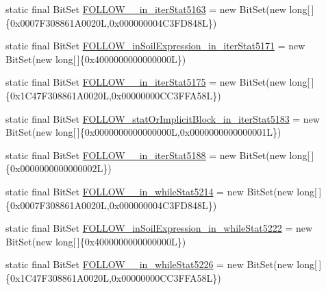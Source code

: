 \begin{DoxyCompactItemize}
\item 
static final Bit\-Set \hyperlink{classorg_1_1tzi_1_1use_1_1parser_1_1shell_1_1_shell_command_parser_af49d5e08066f8ac042ed235657e0912f}{F\-O\-L\-L\-O\-W\-\_\-\_\-in\-\_\-iter\-Stat5163} = new Bit\-Set(new long\mbox{[}$\,$\mbox{]}\{0x0007\-F308861\-A0020\-L,0x000000004\-C3\-F\-D848\-L\})
\item 
static final Bit\-Set \hyperlink{classorg_1_1tzi_1_1use_1_1parser_1_1shell_1_1_shell_command_parser_a2766603c428e92c94c89ec6201239239}{F\-O\-L\-L\-O\-W\-\_\-in\-Soil\-Expression\-\_\-in\-\_\-iter\-Stat5171} = new Bit\-Set(new long\mbox{[}$\,$\mbox{]}\{0x4000000000000000\-L\})
\item 
static final Bit\-Set \hyperlink{classorg_1_1tzi_1_1use_1_1parser_1_1shell_1_1_shell_command_parser_a88328df1abd2318b8b4a519a86657374}{F\-O\-L\-L\-O\-W\-\_\-\_\-in\-\_\-iter\-Stat5175} = new Bit\-Set(new long\mbox{[}$\,$\mbox{]}\{0x1\-C47\-F308861\-A0020\-L,0x00000000\-C\-C3\-F\-F\-A58\-L\})
\item 
static final Bit\-Set \hyperlink{classorg_1_1tzi_1_1use_1_1parser_1_1shell_1_1_shell_command_parser_ad570565fe0be1875ae163d05e69d7868}{F\-O\-L\-L\-O\-W\-\_\-stat\-Or\-Implicit\-Block\-\_\-in\-\_\-iter\-Stat5183} = new Bit\-Set(new long\mbox{[}$\,$\mbox{]}\{0x0000000000000000\-L,0x0000000000000001\-L\})
\item 
static final Bit\-Set \hyperlink{classorg_1_1tzi_1_1use_1_1parser_1_1shell_1_1_shell_command_parser_a505f51e3d4cba50b69c1196e0fa5d54f}{F\-O\-L\-L\-O\-W\-\_\-\_\-in\-\_\-iter\-Stat5188} = new Bit\-Set(new long\mbox{[}$\,$\mbox{]}\{0x0000000000000002\-L\})
\item 
static final Bit\-Set \hyperlink{classorg_1_1tzi_1_1use_1_1parser_1_1shell_1_1_shell_command_parser_a8870c6e97201d7dff7e6845aaefb9c03}{F\-O\-L\-L\-O\-W\-\_\-\_\-in\-\_\-while\-Stat5214} = new Bit\-Set(new long\mbox{[}$\,$\mbox{]}\{0x0007\-F308861\-A0020\-L,0x000000004\-C3\-F\-D848\-L\})
\item 
static final Bit\-Set \hyperlink{classorg_1_1tzi_1_1use_1_1parser_1_1shell_1_1_shell_command_parser_a92e4482b5f684e29d54338b260f57fdf}{F\-O\-L\-L\-O\-W\-\_\-in\-Soil\-Expression\-\_\-in\-\_\-while\-Stat5222} = new Bit\-Set(new long\mbox{[}$\,$\mbox{]}\{0x4000000000000000\-L\})
\item 
static final Bit\-Set \hyperlink{classorg_1_1tzi_1_1use_1_1parser_1_1shell_1_1_shell_command_parser_a44cf78ec312347c8ec4216bdd886900b}{F\-O\-L\-L\-O\-W\-\_\-\_\-in\-\_\-while\-Stat5226} = new Bit\-Set(new long\mbox{[}$\,$\mbox{]}\{0x1\-C47\-F308861\-A0020\-L,0x00000000\-C\-C3\-F\-F\-A58\-L\})

\end{DoxyCompactItemize}
